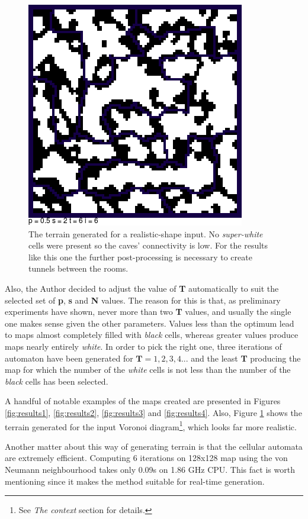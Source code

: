 \documentclass[a4paper, 11pt]{article} %
\begin{document}
\begin{figure}
	\centering
	\includegraphics[scale=0.5]{voronoi}
	\caption{The terrain generated for a realistic-shape input. No \emph{super-white} cells were present so the caves' connectivity is low. For the results like this one the further post-processing is necessary to create tunnels between the rooms.}
	\label{fig:voronoi}
\end{figure}

Also, the Author decided to adjust the value of \textbf{T} automatically to suit the selected set of \textbf{p}, \textbf{s} and \textbf{N} values. The reason for this is that, as preliminary experiments have shown, never more than two \textbf{T} values, and usually the single one makes sense given the other parameters. Values less than the optimum lead to maps almost completely filled with \emph{black} cells, whereas greater values produce maps nearly entirely \emph{white}. In order to pick the right one, three iterations of automaton have been generated for $\textbf{T} = 1,2,3,4...$ and the least \textbf{T} producing the map for which the number of the \emph{white} cells is not less than the number of the \emph{black} cells has been selected.

A handful of notable examples of the maps created are presented in Figures \ref{fig:results1}, \ref{fig:results2}, \ref{fig:results3} and \ref{fig:results4}. Also, Figure \ref{fig:voronoi} shows the terrain generated for the input Voronoi diagram\footnote{See \emph{The context} section for details.}, which looks far more realistic.

Another matter about this way of generating terrain is that the cellular automata are extremely efficient. Computing 6 iterations on 128x128 map using the von Neumann neighbourhood takes only 0.09s on 1.86 GHz CPU. This fact is worth mentioning since it makes the method suitable for real-time generation. 
\end{document}
